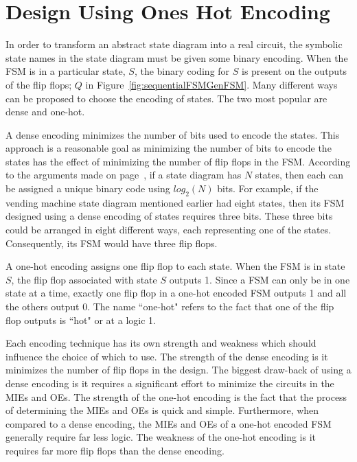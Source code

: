 
\section{Design Using Ones Hot Encoding}

In order to transform an abstract state diagram into a real circuit, the
symbolic state names in the state diagram must be given some binary encoding.
When the FSM is in a particular state, $S$, the binary coding for $S$
is present on the outputs of the flip flops; $Q$ in Figure~\ref{fig:sequentialFSMGenFSM}.
Many different ways can be proposed to choose the encoding of states.  The two most
popular are dense and one-hot.

A dense encoding minimizes the number of bits used to encode the
states.  This approach
is a reasonable goal as minimizing the number of bits to encode the states
has the effect of minimizing the number of flip flops in the FSM.  According to
the arguments made on page~\pageref{page:two-to-N}, if a state diagram has $N$
states, then each can be assigned a unique binary code using $log_2(N)$ bits.
For example, if the vending machine state diagram mentioned earlier had eight
states, then its FSM designed using a dense encoding of states requires
three bits.  These three bits could be arranged in eight different ways, each representing
one of the states.  Consequently, its FSM would have three flip flops.

A one-hot encoding assigns one flip flop to each state.  When the FSM is in
state $S$, the flip flop associated with state $S$ outputs 1. Since a FSM can
only be in one state at a time, exactly one flip flop in a one-hot encoded FSM
outputs 1 and all the others output 0.  The name ``one-hot" refers to the
fact that one of the flip flop outputs is ``hot" or at a logic 1.

Each encoding technique has its own strength and weakness which should
influence the choice of which to use.  The strength of the dense encoding
is it minimizes the number of flip flops in the design.  The biggest
draw-back of using a dense
encoding is it requires a significant effort to minimize the circuits
in the MIEs and OEs. The strength of the one-hot encoding is the fact that
the process of determining the MIEs and OEs is quick and simple.  Furthermore,
when compared to a dense encoding, the MIEs and OEs of a one-hot encoded FSM
generally require far less logic.
The weakness of the one-hot encoding is it requires far more flip flops
than the dense encoding.

